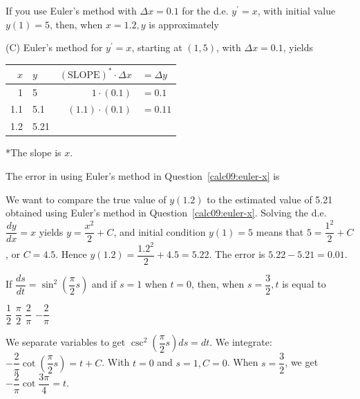 \question\label{calc09:euler-x}
If you use Euler's method with $\Delta x=0.1$ for the d.e. $y^{\prime}=x$, with initial value $y(1)=5$, then, when $x=1.2, y$ is approximately
\begin{choices}
\end{choices}
\begin{solution}
(C) Euler's method for $y^{\prime}=x$, starting at $(1,5)$, with $\Delta x=0.1$, yields
\begin{center}
\begin{tabular}{rlrl}
$x$ & $y$ & $(\mathrm{SLOPE})^{*} \cdot \Delta x$ & $=\Delta y$ \\
\hline
1 & 5 & $1 \cdot(0.1)$ & $=0.1$ \\
1.1 & 5.1 & $(1.1) \cdot(0.1)$ & $=0.11$ \\
1.2 & 5.21 &  &  
\end{tabular}
\end{center}
*The slope is $x$.
\end{solution}

\question
The error in using Euler's method in Question~\ref{calc09:euler-x} is
\begin{choices}
\end{choices}
\begin{solution}
We want to compare the true value of $y(1.2)$ to the estimated value of 5.21 obtained using Euler's method in Question~\ref{calc09:euler-x}. Solving the d.e. $\dfrac{d y}{d x}=x$ yields $y=\dfrac{x^{2}}{2}+C$, and initial condition $y(1)=5$ means that $5=\dfrac{1^{2}}{2}+C$, or $C=4.5$. Hence $y(1.2)=\dfrac{1.2^{2}}{2}+4.5=5.22$. The error is $5.22-5.21=0.01$.
\end{solution}




\newpage



\question
If $\dfrac{d s}{d t}=\sin ^{2}\left(\dfrac{\pi}{2} s\right)$ and if $s=1$ when $t=0$, then, when $s=\dfrac{3}{2}, t$ is equal to
\begin{choices}
  \choice $\dfrac{1}{2}$
  \choice $\dfrac{\pi}{2}$
  \CorrectChoice $\dfrac{2}{\pi}$
  \choice $-\dfrac{2}{\pi}$
\end{choices}
\begin{solution}
We separate variables to get $\csc ^{2}\left(\dfrac{\pi}{2} s\right) d s=d t$. We integrate: $-\dfrac{2}{\pi} \cot \left(\dfrac{\pi}{2} s\right)=t+C$. With $t=0$ and $s=1, C=0$. When $s=\dfrac{3}{2}$, we get $-\dfrac{2}{\pi} \cot \dfrac{3 \pi}{4}=t$.
\end{solution}

